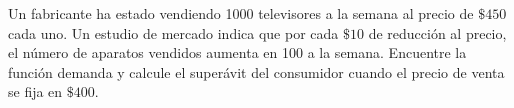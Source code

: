 \item Un fabricante ha estado vendiendo 1000 televisores a la semana al precio de $\$450$ cada uno. Un estudio de mercado indica que por cada $\$10$ de reducción al precio, el número de aparatos vendidos aumenta en 100 a la semana. Encuentre la función demanda y calcule el superávit del consumidor cuando el precio de venta se fija en $\$400$.
